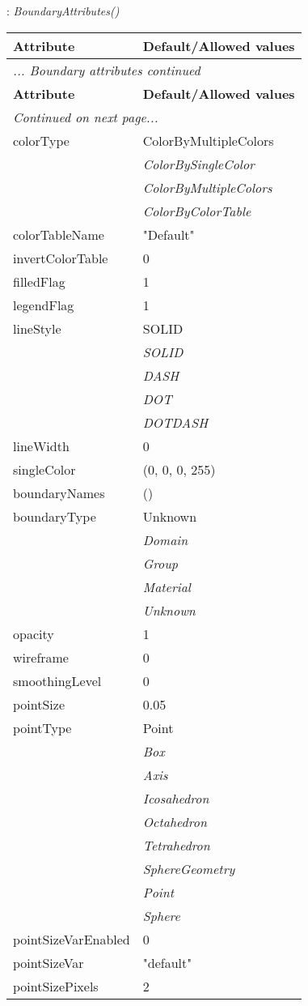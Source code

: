 \documentclass[10pt,a4paper]{report}
\begin{document}
\newpage

{}
: {\it BoundaryAttributes() }\\[-3mm]

\begin{longtable}{ll}
{\bf Attribute} & {\bf Default/Allowed values} \\
\hline \hline
\endfirsthead
\multicolumn{2}{l}{{\it ... Boundary attributes continued}} \\
{\bf Attribute} & {\bf Default/Allowed values} \\
\hline \hline
\endhead
\hline
\multicolumn{2}{l}{{\it Continued on next page...}} \\
\endfoot
\hline
\endlastfoot

colorType  &  ColorByMultipleColors   \\
 & {\it  ColorBySingleColor} \\
 & {\it  ColorByMultipleColors} \\
 & {\it  ColorByColorTable} \\
colorTableName  &  "Default" \\
invertColorTable  &  0 \\
filledFlag  &  1 \\
legendFlag  &  1 \\
lineStyle  &  SOLID   \\
 & {\it  SOLID} \\
 & {\it  DASH} \\
 & {\it  DOT} \\
 & {\it  DOTDASH} \\
lineWidth  &  0 \\
singleColor  &  (0, 0, 0, 255) \\
boundaryNames  &  () \\
boundaryType  &  Unknown   \\
 & {\it  Domain} \\
 & {\it  Group} \\
 & {\it  Material} \\
 & {\it  Unknown} \\
opacity  &  1 \\
wireframe  &  0 \\
smoothingLevel  &  0 \\
pointSize  &  0.05 \\
pointType  &  Point   \\
 & {\it  Box} \\
 & {\it  Axis} \\
 & {\it  Icosahedron} \\
 & {\it  Octahedron} \\
 & {\it  Tetrahedron} \\
 & {\it  SphereGeometry} \\
 & {\it  Point} \\
 & {\it  Sphere} \\
pointSizeVarEnabled  &  0 \\
pointSizeVar  &  "default" \\
pointSizePixels  &  2 \\
\end{longtable}
\end{document}
